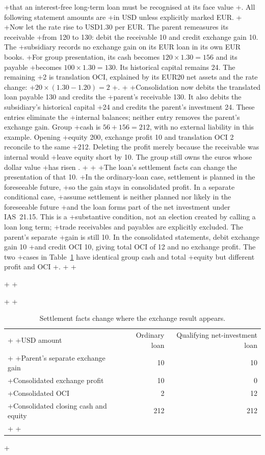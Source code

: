 +that an interest-free long-term loan must be recognised at its face value
+\citep[IAS~21.23--24, .50]{eu20231803}. All following statement amounts are
+in USD unless explicitly marked EUR.
+
+Now let the rate rise to USD1.30 per EUR. The parent remeasures its receivable
+from 120 to 130: debit the receivable 10 and credit exchange gain 10. The
+subsidiary records no exchange gain on its EUR loan in its own EUR books.
+For group presentation, its cash becomes $120\times1.30=156$ and its payable
+becomes $100\times1.30=130$. Its historical capital remains 24. The remaining
+2 is translation OCI, explained by its EUR20 net assets and the rate change:
+$20\times(1.30-1.20)=2$
+\citep[IAS~21.28, .33, .39--41]{eu20231803}.
+
+Consolidation now debits the translated loan payable 130 and credits the
+parent's receivable 130. It also debits the subsidiary's historical capital
+24 and credits the parent's investment 24. These entries eliminate the
+internal balances; neither entry removes the parent's exchange gain. Group
+cash is $56+156=212$, with no external liability in this example. Opening
+equity 200, exchange profit 10 and translation OCI 2 reconcile to the same
+212. Deleting the profit merely because the receivable was internal would
+leave equity short by 10. The group still owns the euros whose dollar value
+has risen \citep[IFRS~10.B86; IAS~21.45]{eu20231803}.
+
+\clearpage
+The loan's settlement facts can change the presentation of that 10.
+In the ordinary-loan case, settlement is planned in the foreseeable future,
+so the gain stays in consolidated profit. In a separate conditional case,
+assume settlement is neither planned nor likely in the foreseeable future
+and the loan forms part of the net investment under IAS~21.15. This is a
+substantive condition, not an election created by calling a loan long term;
+trade receivables and payables are explicitly excluded. The parent's separate
+gain is still 10. In the consolidated statements, debit exchange gain 10
+and credit OCI 10, giving total OCI of 12 and no exchange profit. The two
+cases in Table~\ref{tab:intragroup-fx} have identical group cash and total
+equity but different profit and OCI
+\citep[IAS~21.15, .32--33]{eu20231803}.
+
+\begin{table}[!ht]
+\centering
+\caption{Settlement facts change where the exchange result appears.}
+\label{tab:intragroup-fx}
+\begin{tabular}{@{}lrr@{}}
+\toprule
+USD amount & Ordinary loan & Qualifying net-investment loan \\
+\midrule
+Parent's separate exchange gain & 10 & 10 \\
+Consolidated exchange profit & 10 & 0 \\
+Consolidated OCI & 2 & 12 \\
+Consolidated closing cash and equity & 212 & 212 \\
+\bottomrule
+\end{tabular}
+\end{table}
